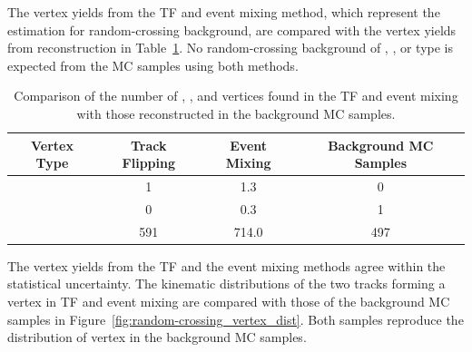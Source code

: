 The vertex yields from the TF and event mixing method, which represent the estimation for random-crossing background, are compared with the vertex yields from reconstruction in Table~\ref{table:random_vertex_count}. No random-crossing background of \mumu, \ee, or \emu type is expected from the MC samples using both methods. 
 
\begin{table}[!htb]
  \centering
  \begin{tabular}{ c  c c c }
    \hline
    \hline
	Vertex Type					& Track Flipping	        & Event Mixing	        & Background MC Samples \\
    \hline
	\mux						&	1						&	1.3 				&	0					\\
	\ex						    &	0						&	0.3 				&	1					\\
	\xx						    &	591 					&	714.0				&	497 				\\
    \hline
    \hline
  \end{tabular}
  \caption{Comparison of the number of \mux, \ex, and \xx vertices found in the TF and event mixing with those reconstructed in the background MC samples.}
  \label{table:random_vertex_count}
\end{table}

The \xx vertex yields from the TF and the event mixing methods agree within the statistical uncertainty. The kinematic distributions of the two tracks forming a vertex in TF and event mixing are compared with those of the background MC samples in Figure~\ref{fig:random-crossing_vertex_dist}. Both samples reproduce the distribution of vertex in the background MC samples.

